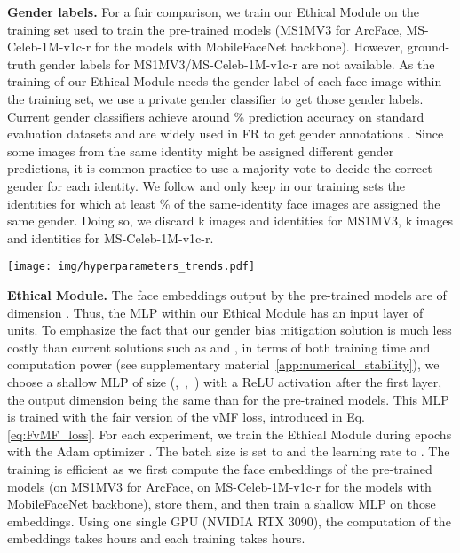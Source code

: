 \documentclass[nohyperref]{article}
\theoremstyle{plain}
\theoremstyle{definition}
\theoremstyle{remark}
\begin{document}
{\bf Gender labels.} For a fair comparison, we train our Ethical Module on the training set used to train the pre-trained models (MS1MV3 for ArcFace, MS-Celeb-1M-v1c-r for the models with MobileFaceNet backbone). However, ground-truth gender labels for MS1MV3/MS-Celeb-1M-v1c-r are not available. As the training of our Ethical Module needs the gender label of each face image within the training set, we use a private gender classifier to get those gender labels. Current gender classifiers achieve around \% prediction accuracy on standard evaluation datasets and are widely used in FR to get gender annotations \cite{measure_privacy, gac}. Since some images from the same identity might be assigned different gender predictions, it is common practice to use a majority vote to decide the correct gender for each identity. We follow \cite{gender_balanced_data} and only keep in our training sets the identities for which at least \% of the same-identity face images are assigned the same gender. Doing so, we discard k images and  identities for MS1MV3, k images and  identities for MS-Celeb-1M-v1c-r.


\begin{figure*}[ht!]
\vspace{-0.2cm}
\hspace{-1cm}
    \texttt{[image: img/hyperparameters\_trends.pdf]}
    \vspace{-0.9cm}
    \caption{Fairness and evaluation metrics on IJB-C for the Ethical Module when one of the two hyperparameters is fixed. The FAR level defining the threshold  is set to ; the pre-trained model is ArcFace with a ResNet100 backbone.  is expressed as a percentage (\%). The three versions of the Ethical Module presented in \autoref{tab:kappa_choice} are annotated with circles.}
    \label{fig:hyperparam_trends}
    \vspace{-0.1in}
\end{figure*}


{\bf Ethical Module.} The face embeddings output by the pre-trained models are of dimension . Thus, the MLP within our Ethical Module has an input layer of  units. To emphasize the fact that our gender bias mitigation solution is much less costly than current solutions such as \cite{mitigating_bias_RL} and \cite{dhar2021pass}, in terms of both training time and computation power (see supplementary material~\ref{app:numerical_stability}), we choose a shallow MLP of size (,~,~) with a ReLU activation after the first layer, the output dimension being the same than for the pre-trained models. This MLP is trained with the fair version  of the vMF loss, introduced in Eq. \ref{eq:FvMF_loss}. For each experiment, we train the Ethical Module during  epochs with the Adam optimizer \cite{adam}. The batch size is set to  and the learning rate to . The training is efficient as we first compute the face embeddings of the pre-trained models (on MS1MV3 for ArcFace, on MS-Celeb-1M-v1c-r for the models with MobileFaceNet backbone), store them, and then train a shallow MLP on those embeddings. Using one single GPU (NVIDIA RTX 3090), the computation of the embeddings takes  hours and each training takes  hours.
\end{document}
